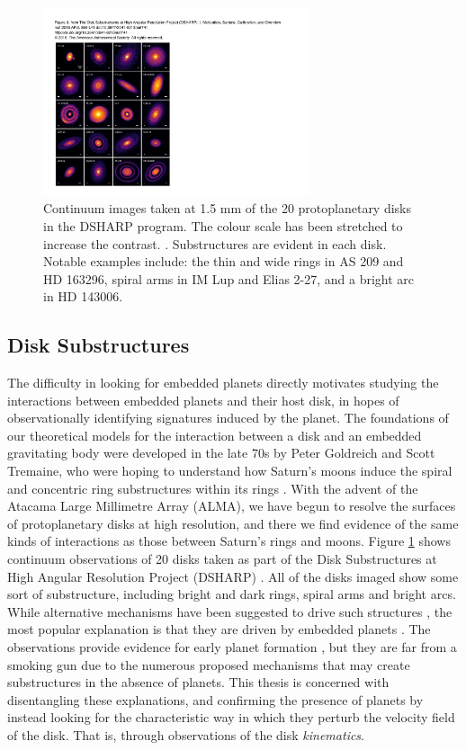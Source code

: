 \begin{figure}
    \centering
    \includegraphics[width = 0.7\textwidth]{figures/DSHARP.pdf}
    \caption{Continuum images taken at 1.5 mm of the 20 protoplanetary disks in the DSHARP program. The colour scale has been stretched to increase the contrast. \citep{andrews2018}. Substructures are evident in each disk. Notable examples include: the thin and wide rings in AS 209 and HD 163296, spiral arms in IM Lup and Elias 2-27, and a bright arc in HD 143006.}
    \label{fig:DSHARP}
\end{figure}

\subsection{Disk Substructures}

The difficulty in looking for embedded planets directly motivates studying the interactions between embedded planets and their host disk, in hopes of observationally identifying signatures induced by the planet.
The foundations of our theoretical models for the interaction between a disk and an embedded gravitating body were developed in the late 70s by Peter Goldreich and Scott Tremaine, who were hoping to understand how Saturn's moons induce the spiral and concentric ring substructures within its rings \citep{goldreich1980}.
With the advent of the Atacama Large Millimetre Array (ALMA), we have begun to resolve the surfaces of protoplanetary disks at high resolution, and there we find evidence of the same kinds of interactions as those between Saturn's rings and moons.
Figure \ref{fig:DSHARP} shows continuum observations of 20 disks taken as part of the Disk Substructures at High Angular Resolution Project (DSHARP) \citep{andrews2018}.
All of the disks imaged show some sort of substructure, including bright and dark rings, spiral arms and bright arcs.
While alternative mechanisms have been suggested to drive such structures \citep[e.g.][]{kretke2007,simon2014,gonzalez2017}, the most popular explanation is that they are driven by embedded planets \citep{dipierro2015,dong2015b,bae2017,fedele2017,fedele2018,zhang2018}.
The observations provide evidence for early planet formation \citep{dipierro2015}, but they are far from a smoking gun due to the numerous proposed mechanisms that may create substructures in the absence of planets.
This thesis is concerned with disentangling these explanations, and confirming the presence of planets by instead looking for the characteristic way in which they perturb the velocity field of the disk.
That is, through observations of the disk \textit{kinematics}.

